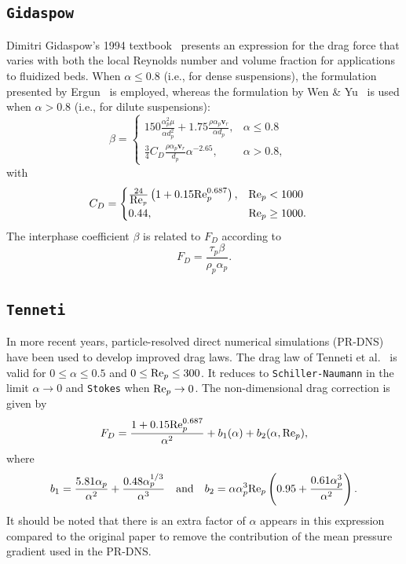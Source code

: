\documentclass[12pt]{article}
\newcommand{\code}[1]{\texttt{#1}}
\newcommand{\Rep}{\mbox{\rm Re}_p} %
\begin{document}
\begin{appendices}
\subsection{\code{Gidaspow}~\cite{gidaspow1994multiphase}}
Dimitri Gidaspow's 1994 textbook~\cite{gidaspow1994multiphase} presents an expression for the drag force that varies with both the local Reynolds number and volume fraction for applications to fluidized beds. When $\alpha\le0.8$ (i.e., for dense suspensions), the formulation presented by Ergun~\cite{ergun1952fluid} is employed, whereas the formulation by Wen \& Yu~\cite{wen1966mechanics} is used when $\alpha>0.8$ (i.e., for dilute suspensions):
\begin{equation}
\beta=\begin{cases}
    150\frac{\alpha_p^2\mu}{\alpha d_p^2}+1.75\frac{\rho\alpha_p\bm{v}_r}{\alpha d_p}, & \alpha\le 0.8\\
    \frac{3}{4} C_D \frac{\rho\alpha_p\bm{v}_r}{d_p}\alpha^{-2.65}, & \alpha > 0.8,
  \end{cases} \quad
\end{equation}
with
\begin{equation}
C_D=\begin{cases}
    \frac{24}{\Rep}\left(1+0.15\Rep^{0.687}\right), & \Rep<1000\\
    0.44, & \Rep\ge1000.
  \end{cases} \quad
\end{equation}
The interphase coefficient $\beta$ is related to $F_D$ according to
\begin{equation}
F_D=\frac{\tau_p\beta}{\rho_p\alpha_p}.
\end{equation}

\subsection{\code{Tenneti}~\cite{tenneti2011drag}}
In more recent years, particle-resolved direct numerical simulations (PR-DNS) have been used to develop improved drag laws. The drag law of Tenneti et al.~\cite{tenneti2011drag} is valid for $0\le\alpha\le0.5$ and $0\le\Rep\le300$. It reduces to \code{Schiller-Naumann} in the limit $\alpha\rightarrow0$ and \code{Stokes} when $\Rep\rightarrow0$. The non-dimensional drag correction is given by
\begin{equation}
F_D=\frac{1+0.15\Rep^{0.687}}{\alpha^2}+b_1(\alpha)+b_2(\alpha,\Rep),
\end{equation}
where
\begin{equation}
b_1=\frac{5.81\alpha_p}{\alpha^2}+\frac{0.48\alpha_p^{1/3}}{\alpha^3}\quad\text{and}\quad b_2=\alpha\alpha_p^3\Rep\left(0.95+\frac{0.61\alpha_p^3}{\alpha^2}\right).
\end{equation}
It should be noted that there is an extra factor of $\alpha$ appears in this expression compared to the original paper to remove the contribution of the mean pressure gradient used in the PR-DNS.
\end{appendices}

\newpage


\end{document}

